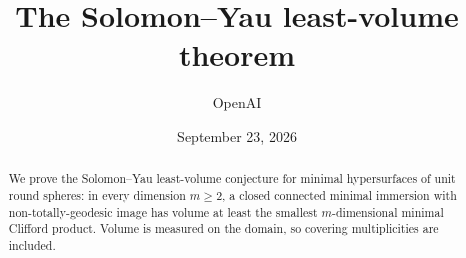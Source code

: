 \documentclass[11pt,a4paper]{article}
\title{The Solomon--Yau least-volume theorem}
\author{OpenAI}
\date{September 23, 2026}
\makeatletter
\theoremstyle{definition}
\theoremstyle{remark}
\numberwithin{equation}{section}
\renewcommand{\maketitle}{%
  \begin{center}
    {\LARGE\bfseries\@title\par}
    \vspace{0.8em}
    {\large\@author\par}
    \vspace{0.4em}
    {\@date\par}
  \end{center}
  \vspace{0.4em}
}
\makeatother
\begin{document}
\maketitle
\begin{abstract}
We prove the Solomon--Yau least-volume conjecture for minimal hypersurfaces of unit round
spheres: in every dimension \(m\ge2\), a closed connected minimal immersion
with non-totally-geodesic image has volume at least the smallest
\(m\)-dimensional minimal Clifford product. Volume is measured on the
domain, so covering multiplicities are included.
\end{abstract}









{}
\begingroup
\small


\endgroup
\end{document}
